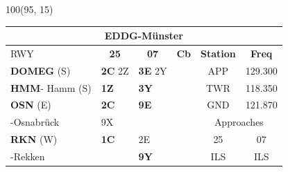 \documentclass[10pt,landscape,a4paper]{article}
\begin{document}
\begin{textblock}{100}(95, 15)
\begin{table}[]
\begin{tabular}{|llllll}
\multicolumn{6}{c}{\textbf{EDDG-Münster}} \\ \hline
\multicolumn{1}{|l|}{RWY} 									& \multicolumn{1}{c|}{\textbf{25}} 				& \multicolumn{1}{c|}{\textbf{07}}  				& \multicolumn{1}{c|}{\textbf{Cb}} 						& \multicolumn{1}{c|}{\textbf{Station}} 	& \multicolumn{1}{c|}{\textbf{Freq}}\\ \hline
\multicolumn{1}{|l|}{\textbf{DOMEG} (S)}							& \multicolumn{1}{l|}{\textbf{2C} 2Z}				& \multicolumn{1}{l|}{\textbf{3E} 2Y} 				& \multicolumn{1}{c|}{\multirow{6}{*}{\rotatebox{90}{5000ft}}}		& \multicolumn{1}{c|}{APP}		& \multicolumn{1}{c|}{129.300}\\
\multicolumn{1}{|l|}{\textbf{HMM}- Hamm (S)}						& \multicolumn{1}{l|}{\textbf{1Z}}				& \multicolumn{1}{l|}{\textbf{3Y}}				& \multicolumn{1}{c|}{}  								& \multicolumn{1}{c|}{TWR}		& \multicolumn{1}{c|}{118.350} \\ \cline{1-3}

\multicolumn{1}{|l|}{\textbf{OSN} (E)} 								& \multicolumn{1}{l|}{\textbf{2C} } 				& \multicolumn{1}{l|}{\textbf{9E}}				& \multicolumn{1}{c|}{} 								& \multicolumn{1}{c|}{GND} 		& \multicolumn{1}{c|}{121.870} \\ \cline{5-6}
\multicolumn{1}{|l|}{-Osnabrück}								& \multicolumn{1}{l|}{9X}						& \multicolumn{1}{l|}{}						& \multicolumn{1}{c|}{} 								& \multicolumn{2}{c|}{Approaches}							\\ \cline{1-3} \cline{5-6}

\multicolumn{1}{|l|}{\textbf{RKN} (W)} 							& \multicolumn{1}{l|}{\textbf{1C}}				& \multicolumn{1}{l|}{2E}						& \multicolumn{1}{c|}{}								& \multicolumn{1}{c|}{25}& \multicolumn{1}{c|}{07} 				\\
\multicolumn{1}{|l|}{-Rekken} 									& \multicolumn{1}{l|}{\textbf{}} 					& \multicolumn{1}{l|}{\textbf{9Y}}				& \multicolumn{1}{c|}{}  								& \multicolumn{1}{c|}{ILS}& \multicolumn{1}{c|}{ILS}\\ \hline
\end{tabular}
\end{table}
\end{textblock}
\end{document}
